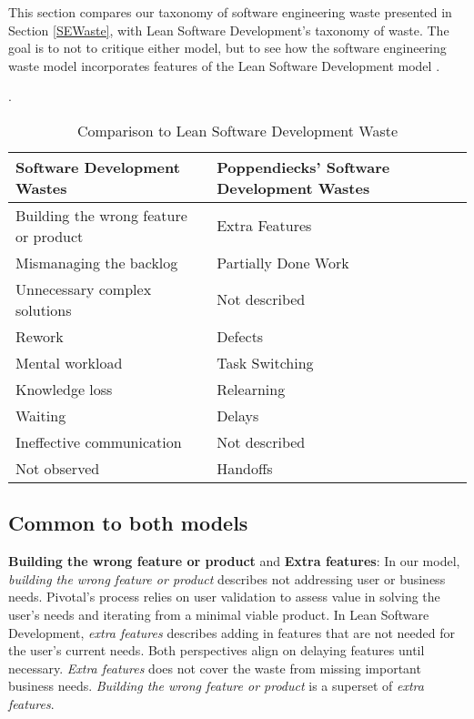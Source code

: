 This section compares our taxonomy of software engineering waste presented in Section \ref{SEWaste}, with Lean Software Development's taxonomy of waste. The goal is to not to critique either model, but to see how the software engineering waste model incorporates features of the Lean Software Development model \cite{PoppendieckConceptToCash}. 

 \cite{GlaserTheoreticalSensitivity}. 


\begin{table}[t]
\renewcommand{\arraystretch}{1.5}
\centering
\caption{Comparison to Lean Software Development Waste}
\label{LeanSoftwareDevelopmentComparisonTable}
\begin{tabular}{|p{1.57in}|p{1.57in}|}
\hline
Software Development Wastes           & Poppendiecks' Software Development Wastes \\ \hline
Building the wrong feature or product & Extra Features                            \\ \hline
Mismanaging the backlog               & Partially Done Work                            \\ \hline
Unnecessary complex solutions                & Not described                             \\ \hline
Rework                                & Defects                                   \\ \hline
Mental workload                 & Task Switching  \\ \hline
Knowledge loss                 & Relearning                            \\ \hline
Waiting                               & Delays                                    \\ \hline
Ineffective communication             & Not described                             \\ \hline
Not observed                          & Handoffs                                  \\ \hline
\end{tabular}
\end{table}
\subsection{Common to both models}
\textbf{Building the wrong feature or product} and \textbf{Extra features}: In our model, \textit{building the wrong feature or product} describes not addressing user or business needs. Pivotal's process relies on user validation to assess value in solving the user's needs and iterating from a minimal viable product. In Lean Software Development, \textit{extra features} describes adding in features that are not needed for the user's current needs. Both perspectives align on delaying features until necessary. \textit{Extra features} does not cover the waste from missing important business needs. \textit{Building the wrong feature or product} is a superset of \textit{extra features}.

